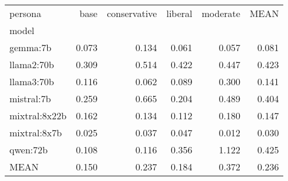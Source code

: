 \begin{table}
\label{tab:questionnaire:moral-foundations.var.agg}
\begin{tabular}{lrrrrr}
\toprule
persona & base & conservative & liberal & moderate & MEAN \\
model &  &  &  &  &  \\
\midrule
gemma:7b & 0.073 & 0.134 & 0.061 & 0.057 & 0.081 \\
llama2:70b & 0.309 & 0.514 & 0.422 & 0.447 & 0.423 \\
llama3:70b & 0.116 & 0.062 & 0.089 & 0.300 & 0.141 \\
mistral:7b & 0.259 & 0.665 & 0.204 & 0.489 & 0.404 \\
mixtral:8x22b & 0.162 & 0.134 & 0.112 & 0.180 & 0.147 \\
mixtral:8x7b & 0.025 & 0.037 & 0.047 & 0.012 & 0.030 \\
qwen:72b & 0.108 & 0.116 & 0.356 & 1.122 & 0.425 \\
MEAN & 0.150 & 0.237 & 0.184 & 0.372 & 0.236 \\
\bottomrule
\end{tabular}
\end{table}
